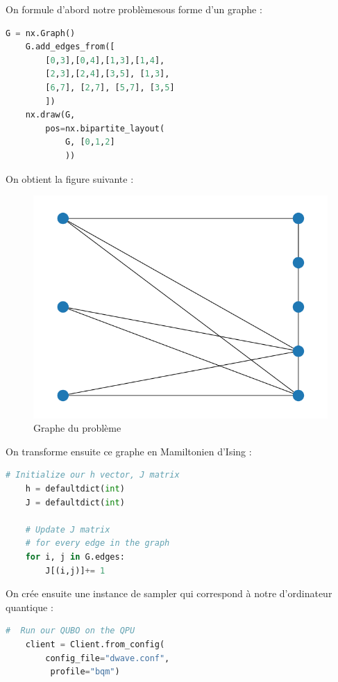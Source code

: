 \documentclass{article}
\begin{document}
\begin{multicols}{2}
On formule d'abord notre problèmesous forme d'un graphe :

\begin{lstlisting}[language=Python]
    G = nx.Graph()
    G.add_edges_from([
        [0,3],[0,4],[1,3],[1,4],
        [2,3],[2,4],[3,5], [1,3],
        [6,7], [2,7], [5,7], [3,5]
        ])
    nx.draw(G, 
        pos=nx.bipartite_layout(
            G, [0,1,2]
            ))
\end{lstlisting}

On obtient la figure suivante :

\begin{figure}[H]
    \centering
    \includegraphics[width = \columnwidth]{fig/oriented_graph.png}
    \caption{Graphe du problème}
    \label{fig:Graph_problem}
\end{figure}

On transforme ensuite ce graphe en Mamiltonien d'Ising :

\begin{lstlisting}[language=Python]
    # Initialize our h vector, J matrix
    h = defaultdict(int)
    J = defaultdict(int)

    # Update J matrix 
    # for every edge in the graph
    for i, j in G.edges:
        J[(i,j)]+= 1
\end{lstlisting}

On crée ensuite une instance de sampler qui correspond à notre d'ordinateur quantique :

\begin{lstlisting}[language=Python]
    #  Run our QUBO on the QPU 
    client = Client.from_config(
        config_file="dwave.conf",
         profile="bqm")


\end{lstlisting}
\end{multicols}
\end{document}
